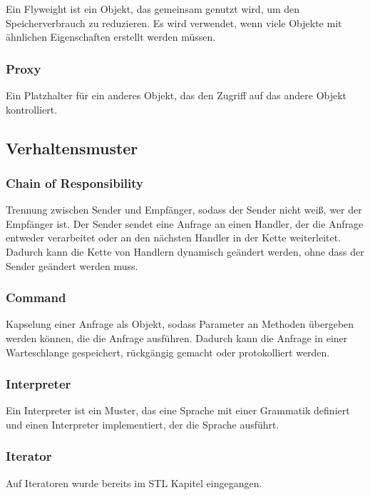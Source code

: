 \documentclass[12pt]{scrartcl}
\begin{document}
Ein Flyweight ist ein Objekt, das gemeinsam genutzt wird, um den Speicherverbrauch zu reduzieren.
Es wird verwendet, wenn viele Objekte mit ähnlichen Eigenschaften erstellt werden müssen.

\subsubsection{Proxy}

Ein Platzhalter für ein anderes Objekt, das den Zugriff auf das andere Objekt kontrolliert.

\subsection{Verhaltensmuster}

\subsubsection{Chain of Responsibility}

Trennung zwischen Sender und Empfänger, sodass der Sender nicht weiß, wer der Empfänger ist.
Der Sender sendet eine Anfrage an einen Handler, der die Anfrage entweder verarbeitet oder an den nächsten Handler in der Kette weiterleitet.
Dadurch kann die Kette von Handlern dynamisch geändert werden, ohne dass der Sender geändert werden muss.

\subsubsection{Command}

Kapselung einer Anfrage als Objekt, sodass Parameter an Methoden übergeben werden können, die die Anfrage ausführen.
Dadurch kann die Anfrage in einer Warteschlange gespeichert, rückgängig gemacht oder protokolliert werden.

\subsubsection{Interpreter}

Ein Interpreter ist ein Muster, das eine Sprache mit einer Grammatik definiert und einen Interpreter implementiert, der die Sprache ausführt.

\subsubsection{Iterator}

Auf Iteratoren wurde bereits im STL Kapitel eingegangen.
\end{document}
